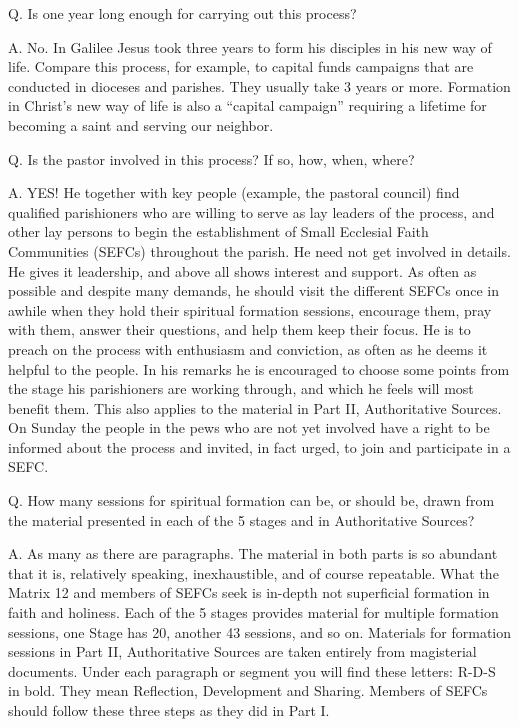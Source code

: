 \documentclass[oneside]{book}
\begin{document}
Q. Is one year long enough for carrying out this process?

A. No. In Galilee Jesus took three years to form his disciples in his new way of
life. Compare this process, for example, to capital funds campaigns that are
conducted in dioceses and parishes. They usually take 3 years or more. Formation
in Christ's new way of life is also a ``capital campaign'' requiring a lifetime
for becoming a saint and serving our neighbor.

Q. Is the pastor involved in this process? If so, how, when, where?

A. YES! He together with key people (example, the pastoral council) find
qualified parishioners who are willing to serve as lay leaders of the process,
and other lay persons to begin the establishment of Small Ecclesial Faith
Communities (SEFCs) throughout the parish. He need not get involved in
details. He gives it leadership, and above all shows interest and support.
As often as possible and despite many demands, he should visit the different
SEFCs once in awhile when they hold their spiritual formation sessions,
encourage them, pray with them, answer their questions, and help them keep their
focus.
He is to preach on the process with enthusiasm and conviction, as often as he
deems it helpful to the people. In his remarks he is encouraged to choose some
points from the stage his parishioners are working through, and which he feels
will most benefit them. This also applies to the material in Part II,
Authoritative Sources. On Sunday the people in the pews who are not yet involved
have a right to be informed about the process and invited, in fact urged, to
join and participate in a SEFC.

Q. How many sessions for spiritual formation can be, or should be, drawn from
the material presented in each of the 5 stages and in Authoritative Sources?

A. As many as there are paragraphs. The material in both parts is so abundant
that it is, relatively speaking, inexhaustible, and of course repeatable. What
the Matrix 12 and members of SEFCs seek is in-depth not superficial formation in
faith and holiness. Each of the 5 stages provides material for multiple
formation sessions, one Stage has 20, another 43 sessions, and so on.
Materials for formation sessions in Part II, Authoritative Sources are taken
entirely from magisterial documents. Under each paragraph or segment you will
find these letters: R-D-S in bold. They mean Reflection, Development and
Sharing. Members of SEFCs should follow these three steps as they did in Part I.
\end{document}
